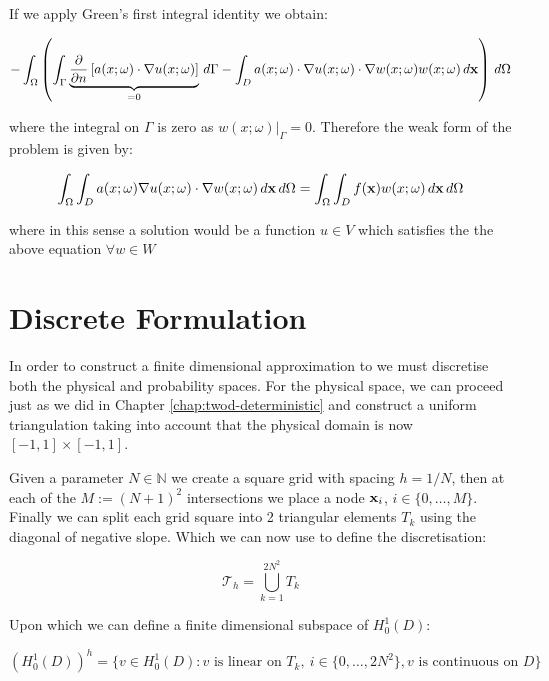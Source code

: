 If we apply Green's first integral identity we obtain:

\begin{equation}
    -\int_{\Omega}\left(\int_{\Gamma}\underbrace{\frac{\partial}{\partial n}
        \left[a(x;\omega)\cdot\nabla u(x;\omega)\right]}_{=0}\, d\Gamma
      -\int_D a(x;\omega)\cdot\nabla u(x;\omega)\cdot\nabla w(x;\omega)
      w(x;\omega)\, d\mathbf{x}
  \right)\, d\Omega
\end{equation}

where the integral on $\Gamma$ is zero as $w(x;\omega)|_\Gamma = 0$. Therefore
the weak form of the problem is given by:

\begin{equation}\label{eq:twod-stochastic-wk}
    \int_{\Omega}\int_Da(x;\omega)\nabla u(x;\omega)\cdot\nabla
    w(x;\omega)\, d\mathbf{x}\, d\Omega =
    \int_{\Omega}\int_D f(\mathbf{x})w(x;\omega)\, d\mathbf{x}\, d\Omega
\end{equation}

where in this sense a solution would be a function $u \in V$ which satisfies
the the above equation $\forall w \in W$

\section{Discrete Formulation}

In order to construct a finite dimensional approximation to
 we must discretise both the physical and probability
spaces. For the physical space, we can proceed just as we did in Chapter
\ref{chap:twod-deterministic} and construct a uniform triangulation taking
into account that the physical domain is now $[-1,1] \times [-1,1]$.

Given a parameter $N \in \mathbb{N}$ we create a
square grid with spacing $h = 1/N$, then at each of the $M := (N+1)^2$
intersections we place a node $\mathbf{x}_i$, $i \in \{0,\ldots, M\}$. Finally we
can split each grid square into 2 triangular elements $T_k$ using the diagonal
of negative slope. Which we can now use to define the discretisation:

\[
    \mathcal{T}_h = \bigcup_{k=1}^{2N^2}T_k
\]

Upon which we can define a finite dimensional subspace of $H^1_0(D)$:

\begin{equation}
    (H^1_0(D))^h = \{v \in H^1_0(D): v \text{ is linear on } T_k,\ i \in \{0, \ldots, 2N^2\},
                      v \text{ is continuous on } D\}
\end{equation}

